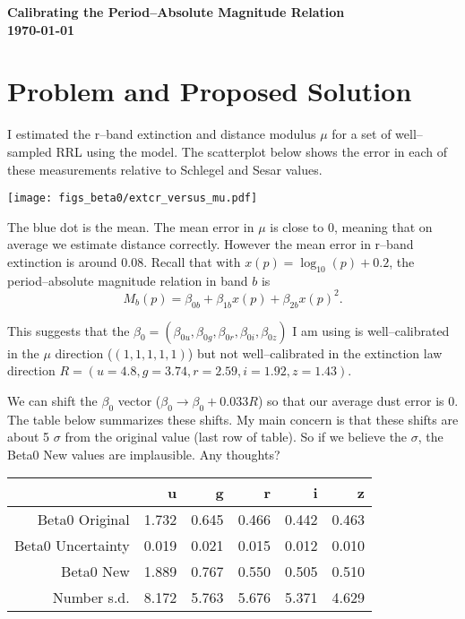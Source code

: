 \documentclass[12pt]{article}
\title{}
\date{}
\author{}
\begin{document}
\noindent
\textbf{Calibrating the Period--Absolute Magnitude Relation}\\
\textbf{\today}\\

\section{Problem and Proposed Solution}

I estimated the r--band extinction and distance modulus $\mu$ for a set of well--sampled RRL using the model. The scatterplot below shows the error in each of these measurements relative to Schlegel and Sesar values.

\begin{center}
\texttt{[image: figs\_beta0/extcr\_versus\_mu.pdf]}
\end{center}

The blue dot is the mean. The mean error in $\mu$ is close to $0$, meaning that on average we estimate distance correctly. However the mean error in r--band extinction is around $0.08$. Recall that with $x(p) = \log_{10}(p) + 0.2$, the period--absolute magnitude relation in band $b$ is
\begin{equation*}
  M_{b}(p) = \beta_{0b} + \beta_{1b}x(p)  + \beta_{2b}x(p)^2.
\end{equation*}


This suggests that the $\beta_0 = (\beta_{0u},\beta_{0g},\beta_{0r},\beta_{0i},\beta_{0z})$ I am using is well--calibrated in the $\mu$ direction ($(1,1,1,1,1)$) but not well--calibrated in the extinction law direction $R = (u=4.8,g=3.74,r=2.59,i=1.92,z=1.43)$.

We can shift the $\beta_0$ vector ($\beta_0 \rightarrow \beta_0 + 0.033R$) so that our average dust error is 0. The table below summarizes these shifts. My main concern is that these shifts are about 5 $\sigma$ from the original value (last row of table). So if we believe the $\sigma$, the Beta0 New values are implausible. Any thoughts?

\begin{center}
\begin{tabular}{rrrrrr}
  & u & g & r & i & z \\ 
  \hline
Beta0 Original & 1.732 & 0.645 & 0.466 & 0.442 & 0.463 \\ 
  Beta0 Uncertainty & 0.019 & 0.021 & 0.015 & 0.012 & 0.010 \\ 
  Beta0 New & 1.889 & 0.767 & 0.550 & 0.505 & 0.510 \\ 
  Number s.d. & 8.172 & 5.763 & 5.676 & 5.371 & 4.629 \\ 
  \end{tabular}
\end{center}
\end{document}

